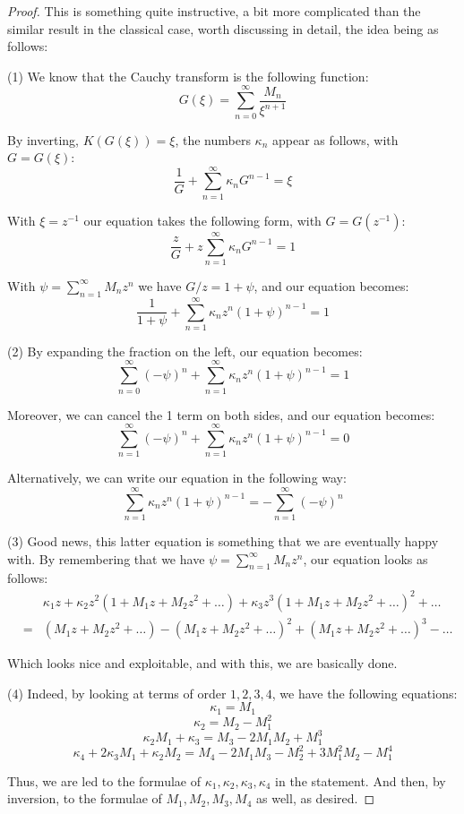\documentclass[12pt]{amsbook}
\begin{document}
\begin{proof}
This is something quite instructive, a bit more complicated than the similar result in the classical case, worth discussing in detail, the idea being as follows:

\medskip

(1) We know that the Cauchy transform is the following function:
$$G(\xi)=\sum_{n=0}^\infty\frac{M_n}{\xi^{n+1}}$$

By inverting, $K(G(\xi))=\xi$, the numbers $\kappa_n$ appear as follows, with $G=G(\xi)$:
$$\frac{1}{G}+\sum_{n=1}^\infty\kappa_nG^{n-1}=\xi$$

With $\xi=z^{-1}$ our equation takes the following form, with $G=G(z^{-1})$:
$$\frac{z}{G}+z\sum_{n=1}^\infty\kappa_nG^{n-1}=1$$

With $\psi=\sum_{n=1}^\infty M_nz^n$ we have $G/z=1+\psi$, and our equation becomes:
$$\frac{1}{1+\psi}+\sum_{n=1}^\infty\kappa_nz^n(1+\psi)^{n-1}=1$$

(2) By expanding the fraction on the left, our equation becomes:
$$\sum_{n=0}^\infty(-\psi)^n+\sum_{n=1}^\infty\kappa_nz^n(1+\psi)^{n-1}=1$$

Moreover, we can cancel the 1 term on both sides, and our equation becomes:
$$\sum_{n=1}^\infty(-\psi)^n+\sum_{n=1}^\infty\kappa_nz^n(1+\psi)^{n-1}=0$$

Alternatively, we can write our equation in the following way:
$$\sum_{n=1}^\infty\kappa_nz^n(1+\psi)^{n-1}=-\sum_{n=1}^\infty(-\psi)^n$$

(3) Good news, this latter equation is something that we are eventually happy with. By remembering that we have $\psi=\sum_{n=1}^\infty M_nz^n$, our equation looks as follows:
\begin{eqnarray*}
&&\kappa_1z+\kappa_2z^2(1+M_1z+M_2z^2+\ldots)+\kappa_3z^3(1+M_1z+M_2z^2+\ldots)^2+\ldots\\
&=&(M_1z+M_2z^2+\ldots)-(M_1z+M_2z^2+\ldots)^2+(M_1z+M_2z^2+\ldots)^3-\ldots
\end{eqnarray*}

Which looks nice and exploitable, and with this, we are basically done.

\medskip

(4) Indeed, by looking at terms of order $1,2,3,4$, we have the following equations:
$$\kappa_1=M_1$$
$$\kappa_2=M_2-M_1^2$$
$$\kappa_2M_1+\kappa_3=M_3-2M_1M_2+M_1^3$$
$$\kappa_4+2\kappa_3M_1+\kappa_2M_2=M_4-2M_1M_3-M_2^2+3M_1^2M_2-M_1^4$$

Thus, we are led to the formulae of $\kappa_1,\kappa_2,\kappa_3,\kappa_4$ in the statement. And then, by inversion, to the formulae of $M_1,M_2,M_3,M_4$ as well, as desired. 
\end{proof}
\end{document}
